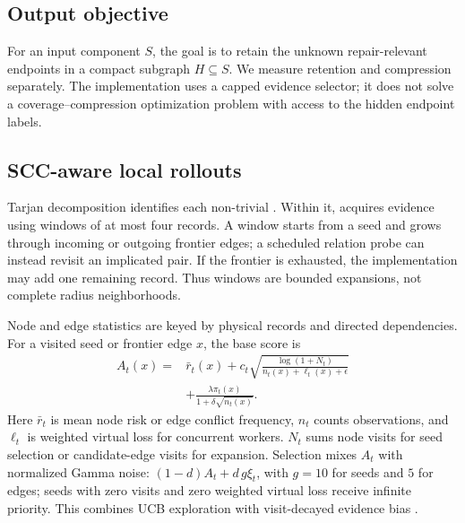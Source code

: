 \begin{revadded}
\subsection{Output objective}

For an input component $S$, the goal is to retain the unknown repair-relevant endpoints in a compact subgraph $H\subseteq S$. We measure retention and compression separately. The implementation uses a capped evidence selector; it does not solve a coverage--compression optimization problem with access to the hidden endpoint labels.

\subsection{SCC-aware local rollouts}

Tarjan decomposition identifies each non-trivial \scc{} \citep{tarjan1972depth}. Within it, \samcgs{} acquires evidence using windows of at most four records. A window starts from a seed and grows through incoming or outgoing frontier edges; a scheduled relation probe can instead revisit an implicated pair. If the frontier is exhausted, the implementation may add one remaining record. Thus windows are bounded expansions, not complete radius neighborhoods.

Node and edge statistics are keyed by physical records and directed dependencies. For a visited seed or frontier edge $x$, the base score is
\begin{equation}
 \begin{aligned}
 A_t(x)={}&\bar r_t(x)+c_t\sqrt{\frac{\log(1+N_t)}{n_t(x)+\ell_t(x)+\epsilon}}\\
       &+\frac{\lambda\pi_t(x)}{1+\delta\sqrt{n_t(x)}}.
 \end{aligned}
 \label{eq:ucb}
\end{equation}
Here $\bar r_t$ is mean node risk or edge conflict frequency, $n_t$ counts observations, and $\ell_t$ is weighted virtual loss for concurrent workers. $N_t$ sums node visits for seed selection or candidate-edge visits for expansion. Selection mixes $A_t$ with normalized Gamma noise: $(1-d)A_t+d\,g\xi_t$, with $g=10$ for seeds and $5$ for edges; seeds with zero visits and zero weighted virtual loss receive infinite priority. This combines UCB exploration with visit-decayed evidence bias \citep{kocsis2006bandit,chaslot2008progressive}.


\end{revadded}
